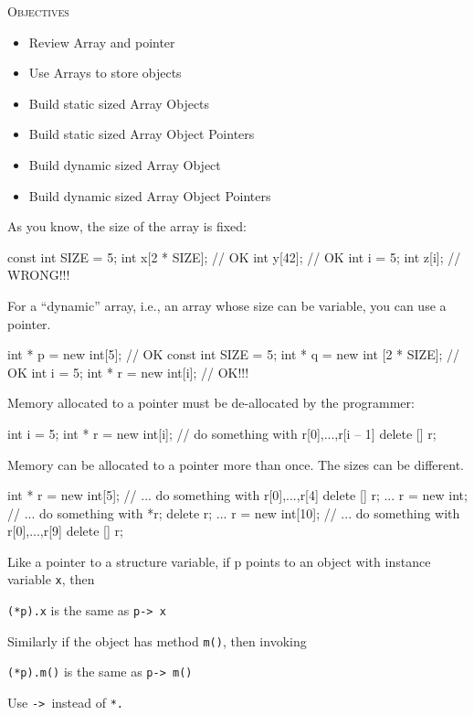 \newpage{}

\textsc{Objectives}

\begin{itemize}
\item
  Review Array and pointer
\item
  Use Arrays to store objects
\item
  Build static sized Array Objects
\item
  Build static sized Array Object Pointers
\item
  Build dynamic sized Array Object
\item
  Build dynamic sized Array Object Pointers
\end{itemize}

\newpage{}

As you know, the size of the array is fixed:
\begin{console}
const int SIZE = 5;
int x[2 * SIZE];        // OK
int y[42];              // OK
int i = 5;
int z[i];               // WRONG!!!
\end{console}
For a ``dynamic'' array, i.e., an array whose size can be variable, you
can use a pointer.
\begin{console}
int * p = new int[5];         // OK
const int SIZE = 5;
int * q = new int [2 * SIZE]; // OK
int i = 5;
int * r = new int[i]; // OK!!!
\end{console}
Memory allocated to a pointer must be de-allocated by the programmer:

\begin{console}
int i = 5;
int * r = new int[i];
// do something with r[0],...,r[i -- 1]
delete [] r;
\end{console}
Memory can be allocated to a pointer more than once. The sizes can be
different.

\begin{console}
int * r = new int[5];
// ... do something with r[0],...,r[4]
delete [] r;
...
r = new int;
// ... do something with *r;
delete r;
...
r = new int[10];
// ... do something with r[0],...,r[9]
delete [] r;
\end{console}
Like a pointer to a structure variable, if p points to an object with
instance variable \texttt{x}, then
\begin{center}
\verb!(*p).x! is the same as \verb!p-> x!
\end{center}
Similarly if the object has method \texttt{m()}, then invoking
\begin{center}
\texttt{(*p).m()} is the same as \texttt{p-> m()}
\end{center}
Use \texttt{-> }instead of \texttt{*.}

